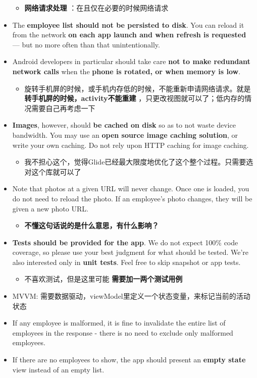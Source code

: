 \documentclass[9pt, b5paper]{article}
\begin{document}
\begin{itemize}
\begin{itemize}
\item \textbf{网络请求处理} ：在且仅在必要的时候网络请求
\end{itemize}
\item The \textbf{employee list should not be persisted to disk}. You can reload it from the network \textbf{on each app launch and when refresh is requested} — but no more often than that unintentionally.
\item Android developers in particular should take care \textbf{not to make redundant network calls} when the \textbf{phone is rotated, or when memory is low}.
\begin{itemize}
\item 旋转手机屏的时候，或手机内存低的时候，不能重新申请网络请求。就是 \textbf{转手机屏的时候，activity不能重建} ，只更改视图就可以了；低内存的情况需要自己再考虑一下
\end{itemize}
\item \textbf{Images}, however, should \textbf{be cached on disk} so as to not waste device bandwidth. You may use an \textbf{open source image caching solution}, or write your own caching. Do not rely upon HTTP caching for image caching.
\begin{itemize}
\item 我不担心这个，觉得Glide已经最大限度地优化了这个整个过程。只需要选对这个库就可以了
\end{itemize}
\item Note that photos at a given URL will never change. Once one is loaded, you do not need to reload the photo. If an employee’s photo changes, they will be given a new photo URL.
\begin{itemize}
\item \textbf{不懂这句话说的是什么意思，有什么影响？}
\end{itemize}
\item \textbf{Tests should be provided for the app}. We do not expect 100\% code coverage, so please use your best judgment for what should be tested. We’re also interested only in \textbf{unit tests}. Feel free to skip snapshot or app tests.
\begin{itemize}
\item 不喜欢测试，但是这里可能 \textbf{需要加一两个测试用例}
\end{itemize}
\item MVVM: 需要数据驱动，viewModel里定义一个状态变量，来标记当前的活动状态
\item If any employee is malformed, it is fine to invalidate the entire list of employees in the response - there is no need to exclude only malformed employees.
\item If there are no employees to show, the app should present an \textbf{empty state} view instead of an empty list.
\end{itemize}
\end{document}
